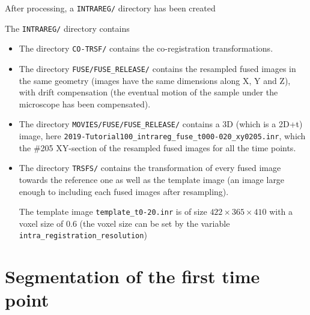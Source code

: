 After processing, a \texttt{INTRAREG/} directory has been created

\mbox{}
\mbox{}

The \texttt{INTRAREG/} directory contains

\mbox{}
\mbox{}

\begin{itemize}
\itemsep -1ex
\item The directory \texttt{CO-TRSF/} contains the co-registration
  transformations.
\item The directory \texttt{FUSE/FUSE\_RELEASE/} contains the resampled fused images
  in the same geometry (images have the same dimensions along X, Y and
  Z), with drift compensation (the eventual motion of the sample under the
  microscope has been compensated). 
\item The directory \texttt{MOVIES/FUSE/FUSE\_RELEASE/} contains a 3D (which is a 2D+t)
  image, here
  \texttt{2019-Tutorial100\_intrareg\_fuse\_t000-020\_xy0205.inr}, which
  the \#205 XY-section of the resampled fused images for all the time
  points.
\item The directory \texttt{TRSFS/}  contains the transformation of
  every fused image towards the reference one as well as the template
  image (an image large enough to including each fused images after
  resampling).

  The template image \texttt{template\_t0-20.inr} is of size $422
  \times 365 \times 410$ with a voxel size of 0.6 (the voxel size can
  be set by the variable \texttt{intra\_registration\_resolution})
\end{itemize}





\section{Segmentation of the first time point}


